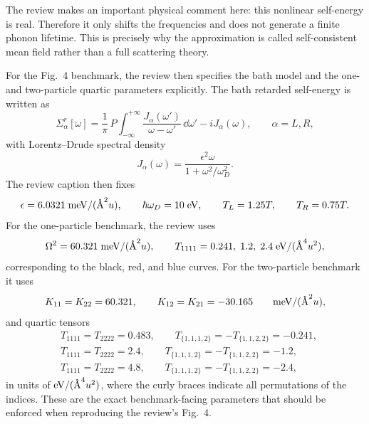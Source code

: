 The review makes an important physical comment here: this nonlinear self-energy is real. Therefore it only shifts the frequencies and does not generate a finite phonon lifetime. This is precisely why the approximation is called self-consistent mean field rather than a full scattering theory.

For the Fig.~4 benchmark, the review then specifies the bath model and the one- and two-particle quartic parameters explicitly. The bath retarded self-energy is written as
\begin{equation}
    \Sigma_\alpha^r[\omega]
    =
    \frac{1}{\pi}\,P\!\!\int_{-\infty}^{+\infty}\frac{J_\alpha(\omega')}{\omega-\omega'}\,\dd\omega'
    - iJ_\alpha(\omega),
    \qquad \alpha=L,R,
    \label{eq:wang2013_lorentz_drude_self_energy}
\end{equation}
with Lorentz--Drude spectral density
\begin{equation}
    J_\alpha(\omega) = \frac{\epsilon^2\omega}{1+\omega^2/\omega_D^2}.
    \label{eq:wang2013_lorentz_drude_J}
\end{equation}
The review caption then fixes
\begin{equation}
    \epsilon = 6.0321\;{\rm meV}/(\text{\AA}^2 u),
    \qquad
    \hbar\omega_D = 10\;{\rm eV},
    \qquad
    T_L = 1.25T,
    \qquad
    T_R = 0.75T.
    \label{eq:wang2013_fig4_bath_parameters}
\end{equation}
For the one-particle benchmark, the review uses
\begin{equation}
    \Omega^2 = 60.321\;{\rm meV}/(\text{\AA}^2 u),
    \qquad
    T_{1111} = 0.241,\;1.2,\;2.4\;{\rm eV}/(\text{\AA}^4 u^2),
    \label{eq:wang2013_fig4_one_particle_params}
\end{equation}
corresponding to the black, red, and blue curves. For the two-particle benchmark it uses
\begin{equation}
    K_{11}=K_{22}=60.321,
    \qquad
    K_{12}=K_{21}=-30.165
    \qquad
    {\rm meV}/(\text{\AA}^2 u),
    \label{eq:wang2013_fig4_two_particle_K}
\end{equation}
and quartic tensors
\begin{align}
    &T_{1111}=T_{2222}=0.483,
    \qquad
    T_{\{1,1,1,2\}}=-T_{\{1,1,2,2\}}=-0.241,
    \label{eq:wang2013_fig4_two_particle_black} \\
    &T_{1111}=T_{2222}=2.4,
    \qquad
    T_{\{1,1,1,2\}}=-T_{\{1,1,2,2\}}=-1.2,
    \label{eq:wang2013_fig4_two_particle_red} \\
    &T_{1111}=T_{2222}=4.8,
    \qquad
    T_{\{1,1,1,2\}}=-T_{\{1,1,2,2\}}=-2.4,
    \label{eq:wang2013_fig4_two_particle_blue}
\end{align}
in units of ${\rm eV}/(\text{\AA}^4 u^2)$, where the curly braces indicate all permutations of the indices. These are the exact benchmark-facing parameters that should be enforced when reproducing the review's Fig.~4.

